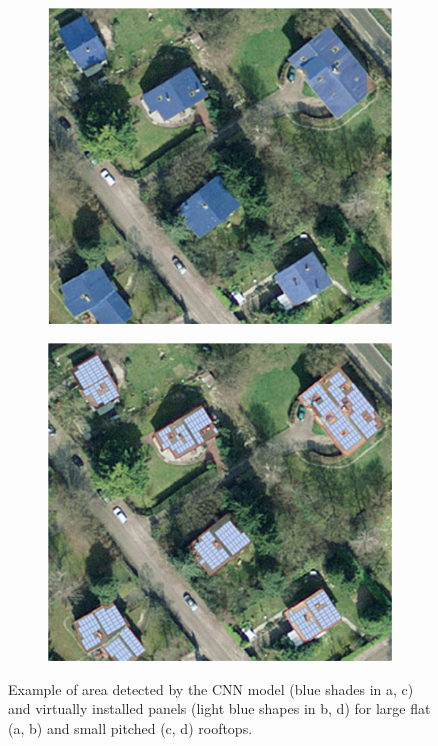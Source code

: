 \begin{figure}[tb]
\begin{subfigure}{.4\textwidth}
  \subcaption{}
    \label{figb:CNN_images}
\end{subfigure}
\begin{subfigure}{.4\textwidth}
  \centering
  \includegraphics[width=\linewidth]{images/Figs/images3.png}
  \subcaption{}
  \label{figc:CNN_images}
\end{subfigure}
\begin{subfigure}{.4\textwidth}
  \centering
  \includegraphics[width=\linewidth]{images/Figs/images4.png}  
  \subcaption{}
    \label{figd:CNN_images}
\end{subfigure}
\caption{Example of area detected by the CNN model (blue shades in a, c) and virtually installed panels (light blue shapes in b, d) for large flat (a, b) and small pitched (c, d) rooftops.}
\label{fig:CNN_images}
\end{figure}

